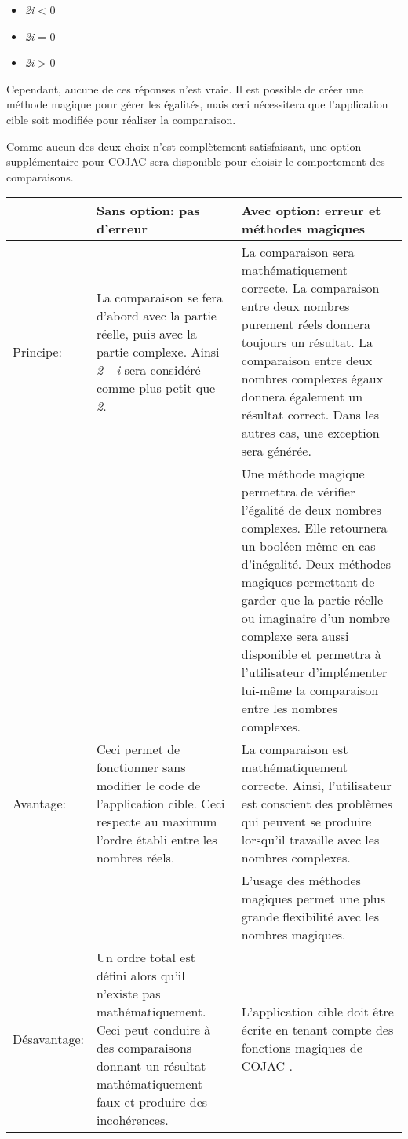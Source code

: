 \begin{itemize}
    \item \textit{2i} < 0
    \item \textit{2i} = 0
    \item \textit{2i} > 0
\end{itemize}

Cependant, aucune de ces réponses n'est vraie. Il est possible de créer une méthode magique pour gérer les égalités, mais ceci nécessitera que l'application cible soit modifiée pour réaliser la comparaison.

Comme aucun des deux choix n'est complètement satisfaisant, une option supplémentaire pour COJAC \cite{COJAC} sera disponible pour choisir le comportement des comparaisons.



\begin{tabularx}{\columnwidth}{| p{6em} | X | X |}
    \hline
     & \textbf{Sans option: pas d'erreur} & \textbf{Avec option: erreur et méthodes magiques} \\
    \hline
    Principe:
    & La comparaison se fera d'abord avec la partie réelle, puis avec la partie complexe. Ainsi \textit{2 - i} sera considéré comme plus petit que \textit{2}.
    & La comparaison sera mathématiquement correcte. La comparaison entre deux nombres purement réels donnera toujours un résultat. La comparaison entre deux nombres complexes égaux donnera également un résultat correct. Dans les autres cas, une exception sera générée. \\
    & & Une méthode magique permettra de vérifier l'égalité de deux nombres complexes. Elle retournera un booléen même en cas d'inégalité. Deux méthodes magiques permettant de garder que la partie réelle ou imaginaire d'un nombre complexe sera aussi disponible et permettra à l'utilisateur d'implémenter lui-même la comparaison entre les nombres complexes.\\
    \hline
    Avantage:
    & Ceci permet de fonctionner sans modifier le code de l'application cible. Ceci respecte au maximum l'ordre établi entre les nombres réels.
    & La comparaison est mathématiquement correcte. Ainsi, l'utilisateur est conscient des problèmes qui peuvent se produire lorsqu'il travaille avec les nombres complexes. \\
    & & L'usage des méthodes magiques permet une plus grande flexibilité avec les nombres magiques. \\
    \hline
    Désavantage:
    & Un ordre total est défini alors qu'il n'existe pas mathématiquement. Ceci peut conduire à des comparaisons donnant un résultat mathématiquement faux et produire des incohérences.
    & L'application cible doit être écrite en tenant compte des fonctions magiques de COJAC \cite{COJAC}. \\
    \hline
\end{tabularx}

